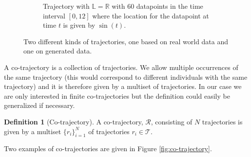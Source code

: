 \documentclass[12pt]{article}
\newcommand{\R}{\mathbb{R}}
\newcommand{\tim}{t}
\newcommand{\traj}{r}
\newcommand{\cotraj}{\mathcal{R}}
\newcommand{\locset}{\mathbb{L}}
\newcommand{\trajset}{\mathcal{T}}
\theoremstyle{definition}
\newtheorem{definition}{Definition}[section]
\begin{document}
\begin{figure}
\begin{subfigure}[t]{0.45\textwidth}
    \caption{Trajectory with \(\locset = \R\) with 60 datapoints in
      the time interval \([0, 12]\) where the location for the
      datapoint at time \(\tim\) is given by \(\sin(\tim)\).}
    \label{fig:trajectory-abstract}
  \end{subfigure}
  \caption{Two different kinds of trajectories, one based on real
    world data and one on generated data.}
  \label{fig:trajectory}
\end{figure}

A co-trajectory is a collection of trajectories. We allow multiple
occurrences of the same trajectory (this would correspond to different
individuals with the same trajectory) and it is therefore given by a
multiset of trajectories. In our case we are only interested in finite
co-trajectories but the definition could easily be generalized if
necessary.
\begin{definition}[Co-trajectory]
  \label{def:co-trajectory}
  A co-trajectory, \(\cotraj\), consisting of \(N\) trajectories is
  given by a multiset \(\{\traj_{i}\}_{i = 1}^{N}\) of trajectories
  \(\traj_{i} \in \trajset\).
\end{definition}
Two examples of co-trajectories are given in Figure
\ref{fig:co-trajectory}.
\end{document}
